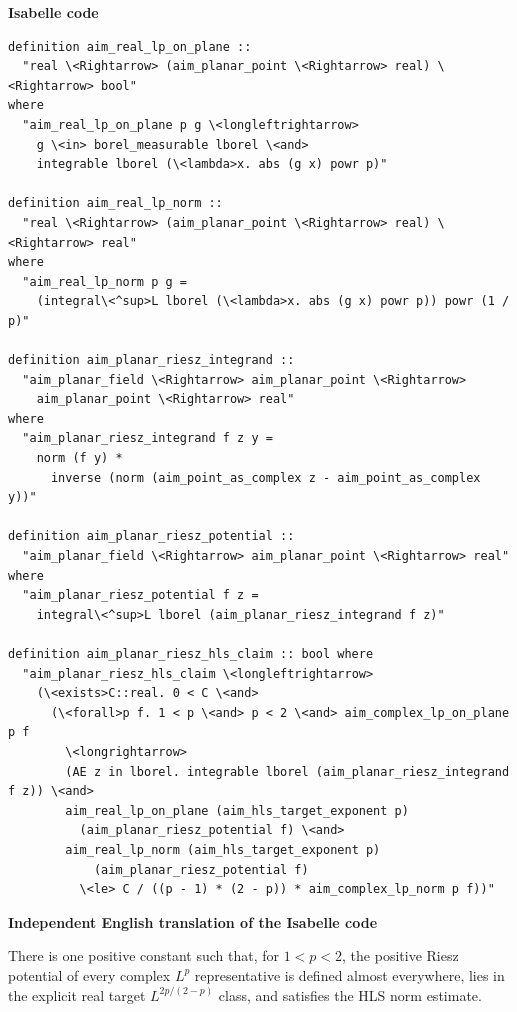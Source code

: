 \documentclass[10pt,oneside]{article}
\newcommand{\reviewlabel}[1]{\par\smallskip\noindent\textsf{\bfseries #1}\par\smallskip}
\begin{document}
\reviewlabel{Isabelle code}
\begin{lstlisting}
definition aim_real_lp_on_plane ::
  "real \<Rightarrow> (aim_planar_point \<Rightarrow> real) \<Rightarrow> bool"
where
  "aim_real_lp_on_plane p g \<longleftrightarrow>
    g \<in> borel_measurable lborel \<and>
    integrable lborel (\<lambda>x. abs (g x) powr p)"

definition aim_real_lp_norm ::
  "real \<Rightarrow> (aim_planar_point \<Rightarrow> real) \<Rightarrow> real"
where
  "aim_real_lp_norm p g =
    (integral\<^sup>L lborel (\<lambda>x. abs (g x) powr p)) powr (1 / p)"

definition aim_planar_riesz_integrand ::
  "aim_planar_field \<Rightarrow> aim_planar_point \<Rightarrow>
    aim_planar_point \<Rightarrow> real"
where
  "aim_planar_riesz_integrand f z y =
    norm (f y) *
      inverse (norm (aim_point_as_complex z - aim_point_as_complex y))"

definition aim_planar_riesz_potential ::
  "aim_planar_field \<Rightarrow> aim_planar_point \<Rightarrow> real"
where
  "aim_planar_riesz_potential f z =
    integral\<^sup>L lborel (aim_planar_riesz_integrand f z)"

definition aim_planar_riesz_hls_claim :: bool where
  "aim_planar_riesz_hls_claim \<longleftrightarrow>
    (\<exists>C::real. 0 < C \<and>
      (\<forall>p f. 1 < p \<and> p < 2 \<and> aim_complex_lp_on_plane p f
        \<longrightarrow>
        (AE z in lborel. integrable lborel (aim_planar_riesz_integrand f z)) \<and>
        aim_real_lp_on_plane (aim_hls_target_exponent p)
          (aim_planar_riesz_potential f) \<and>
        aim_real_lp_norm (aim_hls_target_exponent p)
            (aim_planar_riesz_potential f)
          \<le> C / ((p - 1) * (2 - p)) * aim_complex_lp_norm p f))"
\end{lstlisting}

\reviewlabel{Independent English translation of the Isabelle code}
There is one positive constant such that, for $1<p<2$, the positive Riesz potential of every complex $L^p$ representative is defined almost everywhere, lies in the explicit real target $L^{2p/(2-p)}$ class, and satisfies the HLS norm estimate.

\end{document}
